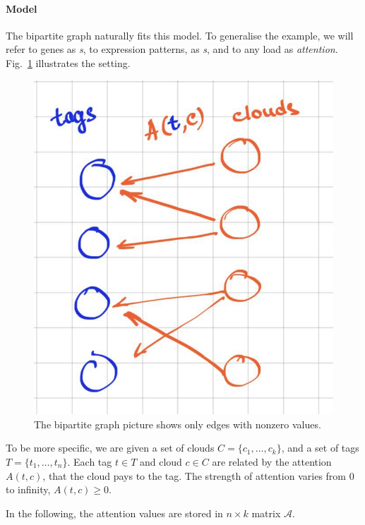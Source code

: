 \documentclass{llncs}
\begin{document}
\paragraph{Model} The bipartite graph naturally fits this model. To generalise the example, we will refer to genes as \textit{{\tag}s}, to expression patterns, as \textit{{\cloud}s}, and to any load as \textit{attention}. Fig.~\ref{fig:nice_name} illustrates the setting.

\begin{figure}
    \centering
    \includegraphics[scale=.25]{bipartite.jpg}
    \caption{The bipartite graph picture shows only edges with nonzero values.}
    \label{fig:nice_name}
\end{figure}

To be more specific, we are given a set of clouds $C = \{c_1, \dots, c_k\}$, and a set of tags $T = \{t_1, \dots, t_n\}$.
Each tag $t \in T$ and cloud $c \in C$ are related by the attention $A(t, c)$, that the cloud pays to the tag. The strength of attention varies from $0$ to infinity, $A(t, c)\ge 0$. 

In the following, the attention values are stored in $n\times k$ matrix $\mathcal{A}$. 
\end{document}
